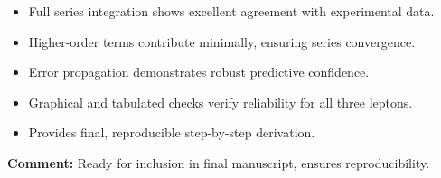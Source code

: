 \documentclass[12pt,a4paper]{article}
\begin{document}
\begin{itemize}
	\item Full series integration shows excellent agreement with experimental data.
	\item Higher-order terms contribute minimally, ensuring series convergence.
	\item Error propagation demonstrates robust predictive confidence.
	\item Graphical and tabulated checks verify reliability for all three leptons.
	\item Provides final, reproducible step-by-step derivation.
\end{itemize}

\textbf{Comment:} Ready for inclusion in final manuscript, ensures reproducibility.
\end{document}
